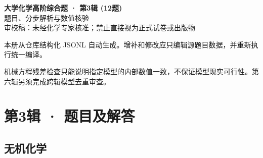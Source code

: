 \documentclass[UTF8,11pt,a4paper]{ctexart}
\begin{document}
\begin{center}
{\LARGE\bfseries 大学化学高阶综合题 · 第3辑 (12题)}\\[0.8em]
{\large 题目、分步解析与数值核验}\\[0.5em]
{\small \textcolor{red!65!black}{审校稿：未经化学专家核准；禁止直接视为正式试卷或出版物}}
\end{center}
\vspace{1em}
\noindent 本册从仓库结构化 JSONL 自动生成。增补和修改应只编辑源题目数据，并重新执行统一编译。
\par 机械方程残差检查只能说明指定模型的内部数值一致，不保证模型现实可行性。第六辑另须完成跨辑模型去重审查。
\tableofcontents
\clearpage
\section*{第3辑 · 题目及解答}
\subsection*{无机化学}
\end{document}
